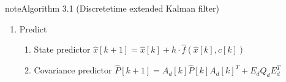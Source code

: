 \begin{sphinxadmonition}{note}{Algorithm 3.1 (Discrete\sphinxhyphen{}time extended Kalman filter)}
\begin{enumerate}
\begin{enumerate}
\begin{enumerate}
Covariance corrector
\(\hat{P}[k] = I_{KC} \cdot \hat{P}[k] I_{KC}^T + K[k] R_d K^T \)

\end{enumerate}

\item {} 

Predict
\begin{enumerate}
%
\item {} 

State predictor
\(\hat{x}[k+1] = \hat{x}[k] + h \cdot \hat{f}(\hat{x}[k], c[k])\)

\item {} 

Covariance predictor
\(\hat{P}[k+1] = A_d[k]  \hat{P}[k] A_d[k]^T + E_d Q_d E_d^T \)

\end{enumerate}

\end{enumerate}

\end{enumerate}
\end{sphinxadmonition}